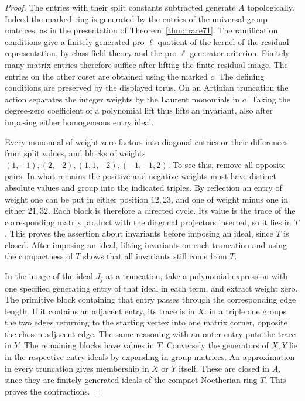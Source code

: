\documentclass[a4paper,11pt]{article}
\theoremstyle{definition}
\theoremstyle{remark}
\numberwithin{equation}{section}
\begin{document}
\begin{proof}
The entries with their split constants subtracted generate \(A\)
topologically. Indeed the marked ring is generated by the
entries of the universal group matrices, as in the presentation
of Theorem~\ref{thm:trace71}. The ramification conditions give
a finitely generated pro-\(\ell\) quotient of the kernel of the
residual representation, by class field theory and the pro-\(\ell\)
generator criterion. Finitely many matrix entries therefore
suffice after lifting the finite residual image. The entries
on the other coset are obtained using the marked \(c\).
The defining conditions are preserved by the displayed torus.
On an Artinian truncation the action separates the integer
weights by the Laurent monomials in \(a\). Taking the degree-zero
coefficient of a polynomial lift thus lifts an invariant,
also after imposing either homogeneous entry ideal.

Every monomial of weight zero factors into diagonal entries
or their differences from split values, and blocks of weights
\((1,-1),(2,-2),(1,1,-2),(-1,-1,2)\). To see this, remove
all opposite pairs. In what remains the positive and negative
weights must have distinct absolute values and group into
the indicated triples. By reflection an entry of weight one
can be put in either position \(12,23\), and one of weight
minus one in either \(21,32\). Each block is therefore a
directed cycle. Its value is the trace of the corresponding
matrix product with the diagonal projectors inserted, so it
lies in \(T\). This proves the assertion about invariants
before imposing an ideal, since \(T\) is closed. After imposing
an ideal, lifting invariants on each truncation and using the
compactness of \(T\) shows that all invariants still come from \(T\).

In the image of the ideal \(J_j\) at a truncation, take a
polynomial expression with one specified generating entry of
that ideal in each term, and extract weight zero. The primitive
block containing that entry passes through the corresponding
edge length. If it contains an adjacent entry, its trace is
in \(X\): in a triple one groups the two edges returning
to the starting vertex into one matrix corner, opposite the
chosen adjacent edge. The same reasoning with an outer entry
puts the trace in \(Y\). The remaining blocks have values
in \(T\). Conversely the generators of \(X,Y\) lie in the
respective entry ideals by expanding in group matrices.
An approximation in every truncation gives membership in
\(X\) or \(Y\) itself. These are closed in \(A\), since they
are finitely generated ideals of the compact Noetherian ring
\(T\). This proves the contractions.


\end{proof}
\end{document}
